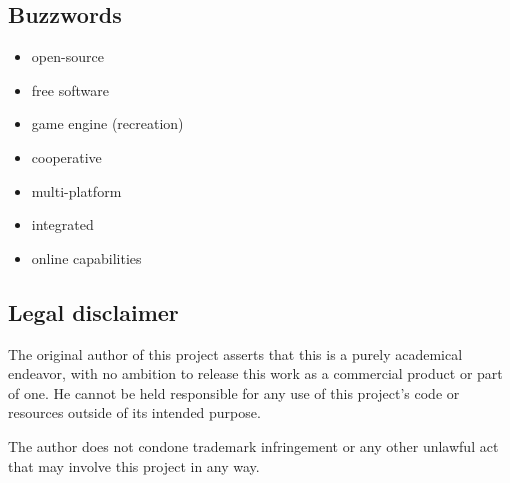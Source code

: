 \documentclass[11pt]{article}
\begin{document}
\subsection{Buzzwords}
\begin{itemize}
	\item open-source
	\item free software
	\item game engine (recreation)
	\item cooperative
	\item multi-platform
	\item integrated
	\item online capabilities
\end{itemize}

\subsection{Legal disclaimer}

The original author of this project asserts that this is a purely academical endeavor, with no ambition to release this work as a commercial product or part of one. He cannot be held responsible for any use of this project's code or resources outside of its intended purpose.

The author does not condone trademark infringement or any other unlawful act that may involve this project in any way.
\end{document}
